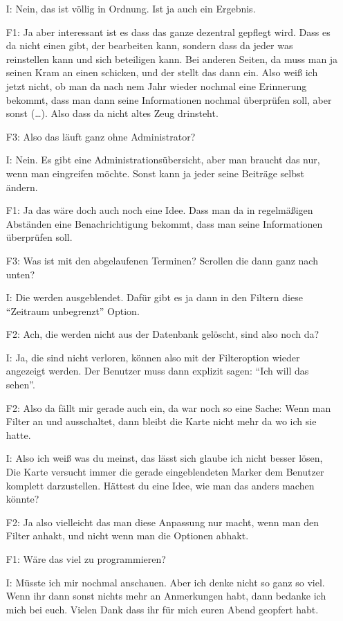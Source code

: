 \begin{itemize}
    \item[I:] Nein, das ist völlig in Ordnung. Ist ja auch ein Ergebnis.
    \item[F1:] Ja aber interessant ist es dass das ganze dezentral gepflegt wird. Dass es da nicht einen gibt, der bearbeiten kann, sondern dass da jeder was reinstellen kann und sich beteiligen kann. Bei anderen Seiten, da muss man ja seinen Kram an einen schicken, und der stellt das dann ein. Also weiß ich jetzt nicht, ob man da nach nem Jahr wieder nochmal eine Erinnerung bekommt, dass man dann seine Informationen nochmal überprüfen soll, aber sonst (\dots). Also dass da nicht altes Zeug drinsteht.
    \item[F3:] Also das läuft ganz ohne Administrator?
    \item[I:] Nein. Es gibt eine Administrationsübersicht, aber man braucht das nur, wenn man eingreifen möchte. Sonst kann ja jeder seine Beiträge selbst ändern.
    \item[F1:] Ja das wäre doch auch noch eine Idee. Dass man da in regelmäßigen Abständen eine Benachrichtigung bekommt, dass man seine Informationen überprüfen soll.
    \item[F3:] Was ist mit den abgelaufenen Terminen? Scrollen die dann ganz nach unten?
    \item[I:] Die werden ausgeblendet. Dafür gibt es ja dann in den Filtern diese "`Zeitraum unbegrenzt"' Option.
    \item[F2:] Ach, die werden nicht aus der Datenbank gelöscht, sind also noch da?
    \item[I:] Ja, die sind nicht verloren, können also mit der Filteroption wieder angezeigt werden. Der Benutzer muss dann explizit sagen: "`Ich will das sehen"'.
    \item[F2:] Also da fällt mir gerade auch ein, da war noch so eine Sache: Wenn man Filter an und ausschaltet, dann bleibt die Karte nicht mehr da wo ich sie hatte.
    \item[I:] Also ich weiß was du meinst, das lässt sich glaube ich nicht besser lösen, Die Karte versucht immer die gerade eingeblendeten Marker dem Benutzer komplett darzustellen. Hättest du eine Idee, wie man das anders machen könnte?
    \item[F2:] Ja also vielleicht das man diese Anpassung nur macht, wenn man den Filter anhakt, und nicht wenn man die Optionen abhakt.
    \item[F1:] Wäre das viel zu programmieren?
    \item[I:] Müsste ich mir nochmal anschauen. Aber ich denke nicht so ganz so viel. Wenn ihr dann sonst nichts mehr an Anmerkungen habt, dann bedanke ich mich bei euch. Vielen Dank dass ihr für mich euren Abend geopfert habt.

\end{itemize}
